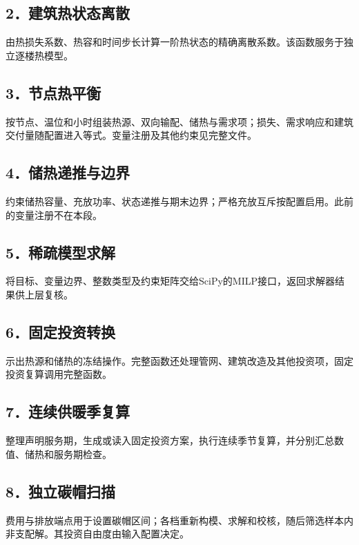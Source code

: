 \subsection*{2．建筑热状态离散}
由热损失系数、热容和时间步长计算一阶热状态的精确离散系数。该函数服务于独立逐楼热模型。

\begingroup
{}

\endgroup

\subsection*{3．节点热平衡}
按节点、温位和小时组装热源、双向输配、储热与需求项；损失、需求响应和建筑交付量随配置进入等式。变量注册及其他约束见完整文件。

\begingroup
{}

\endgroup

\subsection*{4．储热递推与边界}
约束储热容量、充放功率、状态递推与期末边界；严格充放互斥按配置启用。此前的变量注册不在本段。

\begingroup
{}

\endgroup

\subsection*{5．稀疏模型求解}
将目标、变量边界、整数类型及约束矩阵交给SciPy的MILP接口，返回求解器结果供上层复核。

\begingroup
{}

\endgroup

\subsection*{6．固定投资转换}
示出热源和储热的冻结操作。完整函数还处理管网、建筑改造及其他投资项，固定投资复算调用完整函数。

\begingroup
{}

\endgroup

\subsection*{7．连续供暖季复算}
整理声明服务期，生成或读入固定投资方案，执行连续季节复算，并分别汇总数值、储热和服务期检查。

\begingroup
{}

\endgroup

\subsection*{8．独立碳帽扫描}
费用与排放端点用于设置碳帽区间；各档重新构模、求解和校核，随后筛选样本内非支配解。其投资自由度由输入配置决定。

\begingroup
{}

\endgroup

